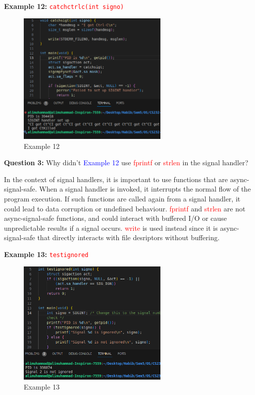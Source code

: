 \documentclass[addpoints]{exam}
\begin{document}
\begin{questions}
    \question
    \textbf{Example 12:} \texttt{\textcolor{red}{catchctrlc(int signo)}}
    \begin{figure}[H]
        \centering
        \includegraphics[width=0.65\textwidth]{eg12.png}
        \caption*{Example 12}
    \end{figure}

    \question
    \textbf{Question 3:} Why didn't \textcolor{blue}{Example 12} use \textcolor{red}{fprintf} or \textcolor{red}{strlen} in the signal handler?
    \begin{solution}
        In the context of signal handlers, it is important to use functions that are async-signal-safe. When a signal handler is invoked, it interrupts the normal flow of the program execution. If such functions are called again from a signal handler, it could lead to data corruption or undefined behaviour. \textcolor{red}{fprintf} and \textcolor{red}{strlen} are not async-signal-safe functions, and could interact with buffered I/O or cause unpredictable results if a signal occurs. \textcolor{red}{write} is used instead since it is async-signal-safe that directly interacts with file desriptors without buffering.
    \end{solution}

    \question
    \textbf{Example 13:} \texttt{\textcolor{red}{testignored}}
    \begin{figure}[H]
        \centering
        \includegraphics[width=0.65\textwidth]{eg13.png}
        \caption*{Example 13}
    \end{figure}
    
\end{questions}
\end{document}
